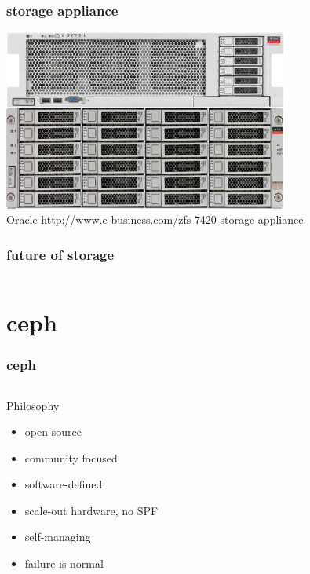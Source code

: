 \documentclass[10pt, compress]{beamer}
\begin{document}
\begin{frame}[fragile]
  \frametitle{storage appliance}
    \begin{center}
    \includegraphics[width=0.7\textwidth]{7420_front_zoom}\\
    \fontsize{3}{3}\selectfont Oracle 
    http://www.e-business.com/zfs-7420-storage-appliance
    \end{center}
\end{frame}

\begin{frame}[fragile]
  \frametitle{future of storage}
    \begin{columns}
        
    \end{columns}
\end{frame}


\section{ceph}
\begin{frame}[fragile]
  \frametitle{ceph}
    \begin{columns}
            \begin{block}{Philosophy}
                \begin{itemize}[<+->]
                \item open-source
                \item community focused
                \item software-defined
                \item scale-out hardware, no SPF
                \item self-managing
                \item failure is normal
                \end{itemize}
            \end{block}
    \end{columns}
\end{frame}
\end{document}
